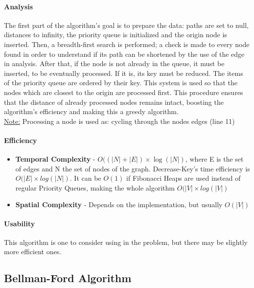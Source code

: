 \paragraph{Analysis}
The first part of the algorithm's goal is to prepare the data: paths are set to null, distances to infinity, the priority queue is initialized and the origin node is inserted. Then, a breadth-first search is performed; a check is made to every node found in order to understand if its path can be shortened by the use of the edge in analysis. After that, if the node is not already in the queue, it must be inserted, to be eventually processed. If it is, its key must be reduced. The items of the priority queue are ordered by their key. This system is used so that the nodes which are closest to the origin are processed first. This procedure ensures that the distance of already processed nodes remains intact, boosting the algorithm's efficiency and making this a greedy algorithm. \\
\uline{Note:} Processing a node is used as: cycling through the nodes edges (line 11)
\paragraph{Efficiency}
\begin{itemize}
    \item \textbf{Temporal Complexity} - $ O((|N|+|E|) \times \log(|N|) $, where E is the set of edges and N the set of nodes of the graph. Decrease-Key's time efficiency is $ O(|E| \times log(|N|)$. It can be $ O(1) $ if Fibonacci Heaps are used instead of regular Priority Queues, making the whole algorithm $ O(|V| \times log(|V|) $ 
    \item \textbf{Spatial Complexity} - Depends on the implementation, but usually $ O(|V|) $
\end{itemize}
\paragraph{Usability}
This algorithm is one to consider using in the problem, but there may be slightly more efficient ones.

\subsection{Bellman-Ford Algorithm}
